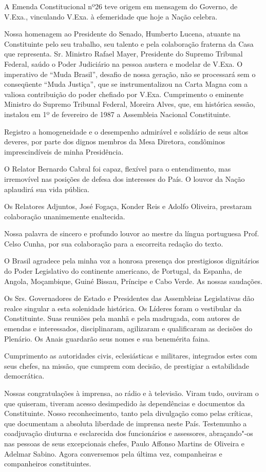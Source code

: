 A Emenda Constitucional nº26 teve origem em mensagem do Governo, de
V.Exa., vinculando V.Exa. à efemeridade que hoje a Nação celebra.

Nossa homenagem ao Presidente do Senado, Humberto Lucena, atuante na
Constituinte pelo seu trabalho, seu talento e pela colaboração fraterna
da Casa que representa. Sr. Ministro Rafael Mayer, Presidente do Supremo
Tribunal Federal, saúdo o Poder Judiciário na pessoa austera e modelar
de V.Exa. O imperativo de ``Muda Brasil'', desafio de nossa geração, não
se processará sem o conseqüente ``Muda Justiça'', que se
instrumentalizou na Carta Magna com a valiosa contribuição do poder
chefiado por V.Exa. Cumprimento o eminente Ministro do Supremo Tribunal
Federal, Moreira Alves, que, em histórica sessão, instalou em 1º de
fevereiro de 1987 a Assembleia Nacional Constituinte.

Registro a homogeneidade e o desempenho admirável e solidário de seus
altos deveres, por parte dos dignos membros da Mesa Diretora, condôminos
imprescindíveis de minha Presidência.

O Relator Bernardo Cabral foi capaz, flexível para o entendimento, mas
irremovível nas posições de defesa dos interesses do País. O louvor da
Nação aplaudirá sua vida pública.

Os Relatores Adjuntos, José Fogaça, Konder Reis e Adolfo Oliveira,
prestaram colaboração unanimemente enaltecida.

Nossa palavra de sincero e profundo louvor ao mestre da língua
portuguesa Prof. Celso Cunha, por sua colaboração para a escorreita
redação do texto.

O Brasil agradece pela minha voz a honrosa presença dos prestigiosos
dignitários do Poder Legislativo do continente americano, de Portugal,
da Espanha, de Angola, Moçambique, Guiné Bissau, Príncipe e Cabo Verde.
As nossas saudações.

Os Srs. Governadores de Estado e Presidentes das Assembleias
Legislativas dão realce singular a esta solenidade histórica. Os Líderes
foram o vestibular da Constituinte. Suas reuniões pela manhã e pela
madrugada, com autores de emendas e interessados, disciplinaram,
agilizaram e qualificaram as decisões do Plenário. Os Anais guardarão
seus nomes e sua benemérita faina.

Cumprimento as autoridades civis, eclesiásticas e militares, integrados
estes com seus chefes, na missão, que cumprem com decisão, de prestigiar
a estabilidade democrática.

Nossas congratulações à imprensa, ao rádio e à televisão. Viram tudo,
ouviram o que quiseram, tiveram acesso desimpedido às dependências e
documentos da Constituinte. Nosso reconhecimento, tanto pela divulgação
como pelas críticas, que documentam a absoluta liberdade de imprensa
neste País. Testemunho a coadjuvação diuturna e esclarecida dos
funcionários e assessores, abraçando"-os nas pessoas de seus excepcionais
chefes, Paulo Affonso Martins de Oliveira e Adelmar Sabino. Agora
conversemos pela última vez, companheiras e companheiros constituintes.


